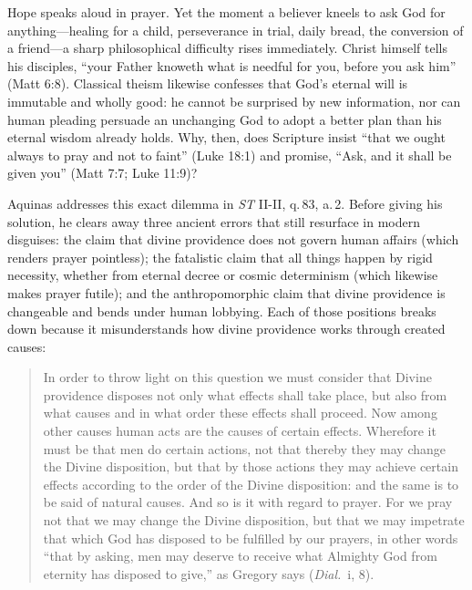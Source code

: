 Hope speaks aloud in prayer. Yet the moment a believer kneels to ask God for anything---healing for a child, perseverance in trial, daily bread, the conversion of a friend---a sharp philosophical difficulty rises immediately. Christ himself tells his disciples, ``your Father knoweth what is needful for you, before you ask him'' (Matt 6:8). Classical theism likewise confesses that God's eternal will is immutable and wholly good: he cannot be surprised by new information, nor can human pleading persuade an unchanging God to adopt a better plan than his eternal wisdom already holds. Why, then, does Scripture insist ``that we ought always to pray and not to faint'' (Luke 18:1) and promise, ``Ask, and it shall be given you'' (Matt 7:7; Luke 11:9)?

Aquinas addresses this exact dilemma in \emph{ST} II-II, q.\,83, a.\,2. Before giving his solution, he clears away three ancient errors that still resurface in modern disguises: the claim that divine providence does not govern human affairs (which renders prayer pointless); the fatalistic claim that all things happen by rigid necessity, whether from eternal decree or cosmic determinism (which likewise makes prayer futile); and the anthropomorphic claim that divine providence is changeable and bends under human lobbying. Each of those positions breaks down because it misunderstands how divine providence works through created causes:

\begin{quote}
In order to throw light on this question we must consider that Divine providence disposes not only what effects shall take place, but also from what causes and in what order these effects shall proceed. Now among other causes human acts are the causes of certain effects. Wherefore it must be that men do certain actions, not that thereby they may change the Divine disposition, but that by those actions they may achieve certain effects according to the order of the Divine disposition: and the same is to be said of natural causes. And so is it with regard to prayer. For we pray not that we may change the Divine disposition, but that we may impetrate that which God has disposed to be fulfilled by our prayers, in other words ``that by asking, men may deserve to receive what Almighty God from eternity has disposed to give,'' as Gregory says (\emph{Dial.}\ i, 8).
\end{quote}

